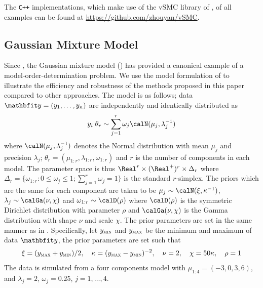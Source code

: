 The \texttt{C++} implementations, which make use of the vSMC library of
\cite{software:VSMC}, of all examples can be found at
\url{https://github.com/zhouyan/vSMC}.

\subsection{Gaussian Mixture Model}
\label{sub:Gaussian Mixture Model}

Since \cite{Richardson:1997ea}, the Gaussian mixture model (\gmm) has
provided a canonical example of a model-order-determination problem. We use
the model formulation of \cite{DelMoral:2006hc} to illustrate the efficiency
and robustness of the methods proposed in this paper compared to other
approaches. The model is as follows; data $\data = (y_1,\dots,y_n)$ are
independently and identically distributed as
\begin{equation*}
  y_i|\theta_r \sim \sum_{j=1}^r \omega_j\calN(\mu_j,\lambda_j^{-1})
\end{equation*}
where $\calN(\mu_j,\lambda_j^{-1})$ denotes the Normal distribution with
mean $\mu_j$ and precision $\lambda_j$; $\theta_r =
(\mu_{1:r},\lambda_{1:r},\omega_{1:r})$ and $r$ is the number of components
in each model. The parameter space is thus $\Real^r \times (\Real^{+})^r\times
\Delta_r$ where $\Delta_r = \{\omega_{1:r}:0\le\omega_j\le1;
\sum_{j=1}^r\omega_j=1\}$ is the standard $r$-simplex. The priors which are
the same for each component are taken to be
$\mu_j\sim\calN(\xi,\kappa^{-1})$, $\lambda_j\sim\calGa(\nu,\chi)$ and
$\omega_{1:r}\sim\calD(\rho)$ where $\calD(\rho)$ is the symmetric Dirichlet
distribution with parameter $\rho$ and $\calGa(\nu,\chi)$ is the Gamma
distribution with shape $\nu$ and scale $\chi$. The prior parameters are set
in the same manner as in \cite{Richardson:1997ea}. Specifically, let $y_{\textsc{min}}$
and $y_{\textsc{max}}$ be the minimum and maximum of data $\data$, the prior parameters
are set such that
\begin{equation*}
  \xi = (y_{\textsc{max}} + y_{\textsc{min}}) / 2, \quad \kappa = (y_{\textsc{max}} - y_{\textsc{min}})^{-2}, \quad
  \nu = 2, \quad \chi = 50\kappa, \quad \rho = 1
\end{equation*}
The data is simulated from a four components model with $\mu_{1:4} = (-3, 0,3,
6)$, and $\lambda_j =2$, $\omega_j = 0.25$, $j = 1,\dots,4$.

